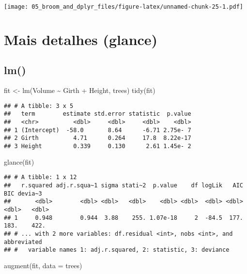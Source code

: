 \documentclass[
]{book}
\newenvironment{Shaded}{\begin{snugshade}}{\end{snugshade}}
\newcommand{\AttributeTok}[1]{\textcolor[rgb]{0.77,0.63,0.00}{#1}}
\newcommand{\FunctionTok}[1]{\textcolor[rgb]{0.00,0.00,0.00}{#1}}
\newcommand{\NormalTok}[1]{#1}
\newcommand{\OtherTok}[1]{\textcolor[rgb]{0.56,0.35,0.01}{#1}}
\newcommand{\SpecialCharTok}[1]{\textcolor[rgb]{0.00,0.00,0.00}{#1}}
\begin{document}
\texttt{[image: 05\_broom\_and\_dplyr\_files/figure-latex/unnamed-chunk-25-1.pdf]}

\hypertarget{mais-detalhes-glance}{%
\section{Mais detalhes (glance)}\label{mais-detalhes-glance}}

\hypertarget{lm}{%
\subsection{lm()}\label{lm}}

\begin{Shaded}
\begin{Highlighting}[]
\NormalTok{fit }\OtherTok{\textless{}{-}} \FunctionTok{lm}\NormalTok{(Volume }\SpecialCharTok{\textasciitilde{}}\NormalTok{ Girth }\SpecialCharTok{+}\NormalTok{ Height, trees)}
\FunctionTok{tidy}\NormalTok{(fit)}
\end{Highlighting}
\end{Shaded}

\begin{verbatim}
## # A tibble: 3 x 5
##   term        estimate std.error statistic  p.value
##   <chr>          <dbl>     <dbl>     <dbl>    <dbl>
## 1 (Intercept)  -58.0       8.64      -6.71 2.75e- 7
## 2 Girth          4.71      0.264     17.8  8.22e-17
## 3 Height         0.339     0.130      2.61 1.45e- 2
\end{verbatim}

\begin{Shaded}
\begin{Highlighting}[]
\FunctionTok{glance}\NormalTok{(fit)}
\end{Highlighting}
\end{Shaded}

\begin{verbatim}
## # A tibble: 1 x 12
##   r.squared adj.r.squa~1 sigma stati~2  p.value    df logLik   AIC   BIC devia~3
##       <dbl>        <dbl> <dbl>   <dbl>    <dbl> <dbl>  <dbl> <dbl> <dbl>   <dbl>
## 1     0.948        0.944  3.88    255. 1.07e-18     2  -84.5  177.  183.    422.
## # ... with 2 more variables: df.residual <int>, nobs <int>, and abbreviated
## #   variable names 1: adj.r.squared, 2: statistic, 3: deviance
\end{verbatim}

\begin{Shaded}
\begin{Highlighting}[]
\FunctionTok{augment}\NormalTok{(fit, }\AttributeTok{data =}\NormalTok{ trees)}
\end{Highlighting}
\end{Shaded}
\end{document}
